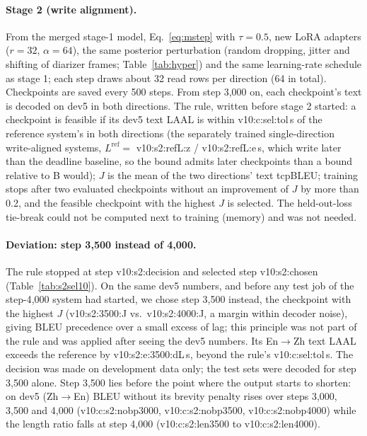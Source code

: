 \paragraph{Stage 2 (write alignment).} From the merged stage-1 model, Eq.~\eqref{eq:mstep} with $\tau=0.5$, new
LoRA adapters ($r=32$, $\alpha=64$), the same posterior perturbation (random dropping, jitter and shifting of diarizer frames; Table~\ref{tab:hyper}) and
the same learning-rate schedule as stage 1; each
step draws about 32 read rows per direction (64 in total). Checkpoints are saved every 500 steps. From step 3{,}000 on,
each checkpoint's text is decoded on dev5 in both directions. The rule, written before stage 2 started: a checkpoint is
feasible if its dev5 text LAAL is within \num{v10:c:sel:tol}\,s of the reference system's in both directions (the
separately trained single-direction write-aligned systems, $L^{\mathrm{ref}}=$ \num{v10:s2:refL:z} /
\num{v10:s2:refL:e}\,s, which write later than the deadline baseline, so the bound admits later checkpoints than a bound
relative to B would); $J$ is the mean of the two directions' text tcpBLEU; training stops after two evaluated
checkpoints without an improvement of $J$ by more than 0.2, and the feasible checkpoint with the highest $J$ is selected.
The held-out-loss tie-break could not be computed next to training (memory) and was not needed.



\paragraph{Deviation: step 3{,}500 instead of 4{,}000.} The rule stopped at step \num{v10:s2:decision} and selected step
\num{v10:s2:chosen} (Table~\ref{tab:s2sel10}). On the same dev5 numbers, and before any test job of the step-4{,}000
system had started, we chose step 3{,}500 instead, the checkpoint with the highest $J$ (\num{v10:s2:3500:J} vs.\
\num{v10:s2:4000:J}, a margin within decoder noise), giving BLEU precedence over a small excess of lag; this principle
was not part of the rule and was applied after seeing the dev5 numbers. Its En$\rightarrow$Zh text
LAAL exceeds the reference by \num{v10:s2:e:3500:dL}\,s, beyond the rule's \num{v10:c:sel:tol}\,s. The decision
was made on development data only; the test sets were decoded for step 3{,}500 alone. Step 3{,}500 lies before the point
where the output starts to shorten: on dev5 (Zh$\rightarrow$En) BLEU without its brevity penalty rises over steps 3{,}000,
3{,}500 and 4{,}000 (\num{v10:c:s2:nobp3000}, \num{v10:c:s2:nobp3500}, \num{v10:c:s2:nobp4000}) while the length ratio
falls at step 4{,}000 (\num{v10:c:s2:len3500} to \num{v10:c:s2:len4000}).

